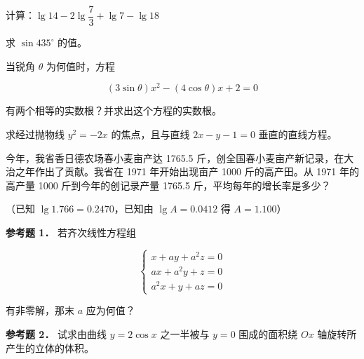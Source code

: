 \begin{question}
计算：$\lg14-2\lg\dfrac73+\lg7-\lg18$

\end{question}
\begin{question}
求 $\sin435^\circ$ 的值。

\end{question}
\begin{question}
当锐角 $\theta$ 为何值时，方程

\nopagebreak[4]
\[
(3\sin\theta)x^2-(4\cos\theta)x+2=0
\]

有两个相等的实数根？并求出这个方程的实数根。

\end{question}
\begin{question}
求经过抛物线 $y^2=-2x$ 的焦点，且与直线 $2x-y-1=0$ 垂直的直线方程。

\end{question}
\begin{question}
今年，我省香日德农场春小麦亩产达 1765.5 斤，创全国春小麦亩产新记录，在大治之年作出了贡献。我省在 1971 年开始出现亩产 1000 斤的高产田。从 1971 年的高产量 1000 斤到今年的创记录产量 1765.5 斤，平均每年的增长率是多少？

（已知 $\lg1.766=0.2470$，已知由 $\lg A=0.0412$ 得 $A=1.100$）

\textbf{参考题 1．} 若齐次线性方程组

\nopagebreak[4]
\[
\begin{cases}
x+ay+a^2z=0\\
ax+a^2y+z=0\\
a^2x+y+az=0
\end{cases}
\]

有非零解，那末 $a$ 应为何值？

\textbf{参考题 2．} 试求由曲线 $y=2\cos x$ 之一半被与 $y=0$ 围成的面积绕 $Ox$ 轴旋转所产生的立体的体积。

\end{question}